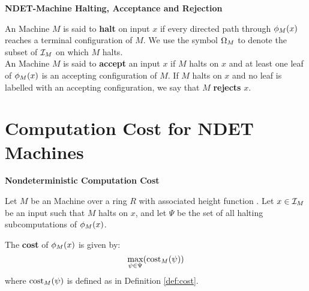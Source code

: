 
\begin{definition} \textbf{NDET-Machine Halting, Acceptance and Rejection}

  An \ndet Machine $M$ is said to \textbf{halt} on input $x$ if every
  directed path through $\phi_M(x)$ reaches a terminal
  configuration of $M$.  We use the symbol $\Omega_M$ to denote the
  subset of $\mathcal{I}_M$ on which $M$ halts.\\
  
  An \ndet Machine $M$ is said to \textbf{accept} an input $x$ if $M$
  halts on $x$ and at least one leaf of $\phi_M(x)$ is an
  accepting configuration of $M$. If $M$ halts on $x$ and no leaf is
  labelled with an accepting configuration, we say that $M$
  \textbf{rejects} $x$.
  
\end{definition}

\section{Computation Cost for  NDET Machines}

\begin{definition}{\textbf{Nondeterministic Computation Cost}}

  Let $M$ be an \ndet Machine over a ring $R$ with associated height
  function .  Let $x \in \mathcal{I}_M$ be an
  input such that $M$ halts on $x$, and let $\Psi$ be the set of all
  halting subcomputations of $\phi_M(x)$.

  The \textbf{cost} of $\phi_M(x)$ is given
  by: $$\max\limits_{\psi \in \Psi}(\text{cost}_M(\psi))$$ where
  $\text{cost}_M(\psi)$ is defined as in Definition \ref{def:cost}.

\end{definition}



